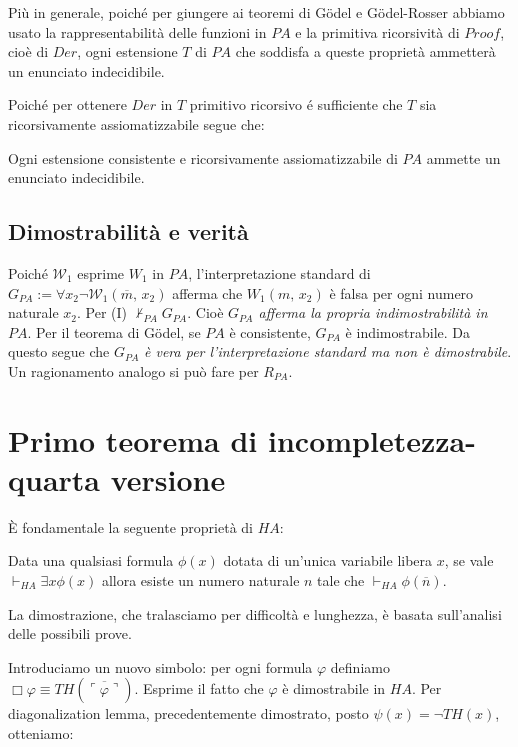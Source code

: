 	Pi\`u in generale, poich\'e per giungere ai teoremi
	di G\"odel e G\"odel-Rosser abbiamo
	usato la rappresentabilit\`a delle funzioni in $PA$ e la primitiva
	ricorsivit\`a di $Proof$, cio\`e di $Der$, ogni estensione $T$ di $PA$ che
	soddisfa a queste propriet\`a ammetter\`a un enunciato indecidibile.
	
	Poich\'e per ottenere $Der$ in $T$ primitivo ricorsivo \'e sufficiente
	che $T$ sia ricorsivamente assiomatizzabile segue che:
	
	\begin{thm}
	Ogni estensione consistente e ricorsivamente assiomatizzabile di $PA$
	ammette un enunciato indecidibile.
	\end{thm}
	
\subsection{Dimostrabilit\`a e verit\`a}
	
	Poich\'e $\mathcal{W}_1$ esprime $W_1$ in $PA$,
	l'interpretazione standard di $G_{PA}:=\forall x_2\neg
	\mathcal{W}_1(\overline{m},\,x_2)$ afferma che $W_1(m,\,x_2)$ \`e falsa per
	ogni numero naturale $x_2$. Per (I) $\not\vdash_{PA}G_{PA}$.
	Cio\`e \textit{$G_{PA}$ afferma la propria indimostrabilit\`a in
	$PA$}. Per il teorema di G\"odel, se $PA$ \`e consistente,
	$G_{PA}$ \`e indimostrabile. Da questo segue che $G_{PA}$ \textit{\`e vera per
	l'interpretazione standard ma non \`e dimostrabile}. Un ragionamento analogo
	si pu\`o fare per $R_{PA}$.
	
\section{Primo teorema di incompletezza-quarta versione}

	\`E fondamentale la seguente propriet\`a di $HA$:

	\begin{thm}
	Data una qualsiasi formula $\phi(x)$ dotata di un'unica variabile libera $x$,
	se vale $\vdash_{HA}\exists x\phi(x)$ allora esiste un numero naturale
	$n$ tale che $\vdash_{HA}\phi(\overline{n})$.
	\end{thm}
	La dimostrazione, che tralasciamo per difficolt\`a e lunghezza,
	\`e basata sull'analisi delle possibili prove.

	Introduciamo un nuovo
	simbolo: per ogni formula $\varphi$ definiamo
	$\Box\varphi\equiv TH(\overline{\ulcorner \varphi \urcorner})$.
	Esprime il fatto che $\varphi$ \`e dimostrabile in $HA$.
	Per diagonalization lemma, precedentemente dimostrato,
	posto $\psi(x)=\neg TH(x)$, otteniamo:

